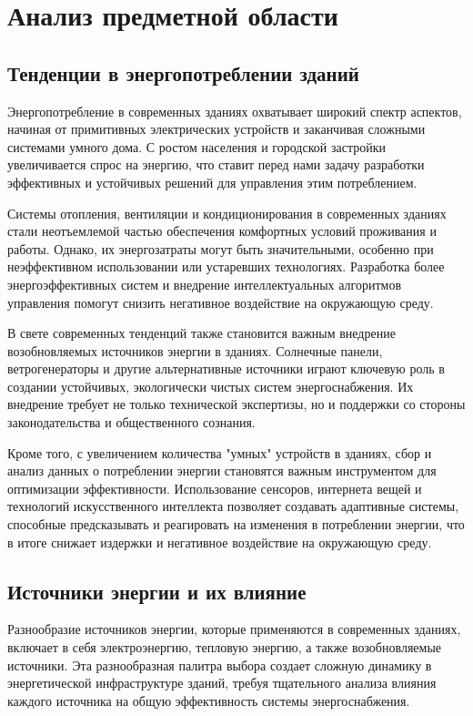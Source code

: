 \section{Анализ предметной области}
\subsection{Тенденции в энергопотреблении зданий}

Энергопотребление в современных зданиях охватывает широкий спектр аспектов, начиная от примитивных электрических устройств и заканчивая сложными системами умного дома. С ростом населения и городской застройки увеличивается спрос на энергию, что ставит перед нами задачу разработки эффективных и устойчивых решений для управления этим потреблением.

Системы отопления, вентиляции и кондиционирования в современных зданиях стали неотъемлемой частью обеспечения комфортных условий проживания и работы. Однако, их энергозатраты могут быть значительными, особенно при неэффективном использовании или устаревших технологиях. Разработка более энергоэффективных систем и внедрение интеллектуальных алгоритмов управления помогут снизить негативное воздействие на окружающую среду.

В свете современных тенденций также становится важным внедрение возобновляемых источников энергии в зданиях. Солнечные панели, ветрогенераторы и другие альтернативные источники играют ключевую роль в создании устойчивых, экологически чистых систем энергоснабжения. Их внедрение требует не только технической экспертизы, но и поддержки со стороны законодательства и общественного сознания.

Кроме того, с увеличением количества "умных" устройств в зданиях, сбор и анализ данных о потреблении энергии становятся важным инструментом для оптимизации эффективности. Использование сенсоров, интернета вещей и технологий искусственного интеллекта позволяет создавать адаптивные системы, способные предсказывать и реагировать на изменения в потреблении энергии, что в итоге снижает издержки и негативное воздействие на окружающую среду.

\subsection{Источники энергии и их влияние}

Разнообразие источников энергии, которые применяются в современных зданиях, включает в себя электроэнергию, тепловую энергию, а также возобновляемые источники. Эта разнообразная палитра выбора создает сложную динамику в энергетической инфраструктуре зданий, требуя тщательного анализа влияния каждого источника на общую эффективность системы энергоснабжения.

